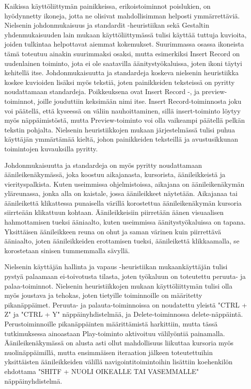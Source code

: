 \documentclass[utf8]{gradu3}
\begin{document}
Kaikissa käyttöliittymän painikkeissa, erikoistoiminnot poislukien, on hyödynnetty ikoneja, jotta ne olisivat mahdollisimman helposti ymmärrettäviä. Nielsenin johdonmukaisuus ja standardit -heuristiikan sekä Gestaltin yhdenmukaisuuden lain mukaan käyttöliittymässä tulisi käyttää tuttuja kuvioita, joiden tulkintaa helpottavat aiemmat kokemukset. Suurimmassa osassa ikoneista tämä toteutuu ainakin suurimmaksi osaksi, mutta esimerkiksi Insert Record on uudenlainen toiminto, jota ei ole saatavilla äänitystyökaluissa, joten ikoni täytyi kehitellä itse. Johdonmukaisuutta ja standardeja koskeva nielsenin heuristiikka koskee kuvioiden lisäksi myös tekstiä, joten painikkeiden teksteissä on pyritty noudattamaan standardeja. Poikkeuksena ovat Insert Record -, ja preview-toiminnot, joille jouduttiin keksimään nimi itse. Insert Record-toiminnosta joku voi päätellä, että kyseessä on väliin nauhoittaminen, sillä insert-toiminto löytyy myös näppäimistöstä, mutta Preview-toiminto voi olla vaikeampi päätellä pelkän tekstin pohjalta. Nielsenin heuristiikkojen mukaan järjestelmässä tulisi puhua käyttäjän ymmärtämää kieltä, johon painikkeiden teksteillä ja avustusikkunan toimintojen kuvauksilla pyritty.

Johdonmukaisuutta ja standardeja on myös pyritty noudattamaan äänileikenäkymässä, joka koostuu aikajanasta, kursorista, äänileikkeistä ja vierityspalkista. Kuten useimmissa ohjelmistoissa, aikajana on äänileikenäkymän yläreunassa, jonka alla on kaistale, jossa äänileikkeet näytetään. Aikajanaa tai äänileikettä klikattessa punaisella värillä korostettua äänileikenäkymän kursoria siirrteään klikattuun kohtaan. Äänileikkeisiin piirretään äänen visuaalisen hahmottamisen tueksi ääniaalto, kuten useimmissa äänitystyökaluissa on tapana. Yksittäisen äänileikkeen reuna on ohut ja saman värinen kuin piirrettävä ääniaalto, joten äänileikkeiden erottamisen tueksi, äänileikettä klikkaamalla, se korostetaan sinisen tummemmalla sävyllä.

Nielsenin käyttäjän hallinta ja vapaus -heuristiikan mukaankäyttäjän tulisi pystyä palaamaan ei-toivotusta tilasta, joten työkaluun on toteutettu peruuta- ja palaa-toiminnot. Nielsenin heuristiikkojen mukaan käyttöliittymän tulisi olla myös joustava ja tehokas, joten tietyille toiminnoille on määritetty pikanäppäimet. Peruuta- ja palauta-toiminnoissa on noudatettu yleistä "CTRL + Z" ja "CTRL + Y" näppäinyhdistelmää, ja Delete-toiminnossa delete-näppäintä. Perustoiminnoille pikanäppäinten määrittämistä harkittiin, mutta tässä tutkimuksessa ainoastaan Play-toiminto aktivoituu välilyöntiä painamalla. Äänileikenäkymässä on alusta asti ollut mahdollisuus liikuttaa kursoria myös nuolinäppäimillä, mutta ensimmäisen iteraation jälkeen toteutettuihin yksittäisten äänileikkeiden välillä navigointitoimintoihin lisättiin koehenkilön ehdottama "SHITF + NUOLI OIKEALLE TAI VASEMMALLE" näppäinyhdistelmä.
\end{document}
